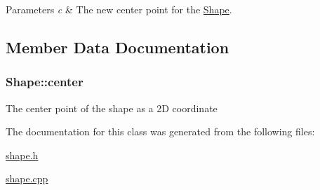 \begin{DoxyParams}{Parameters}
{\em c} & The new center point for the \hyperlink{class_shape}{Shape}. \\
\hline
\end{DoxyParams}


\subsection{Member Data Documentation}
\subsubsection[{\texorpdfstring{center}{center}}]{ Shape\+::center\hspace{0.3cm}{\ttfamily [protected]}}\hypertarget{class_shape_afa00babba48f541ad2754cb22a83c421}{}\label{class_shape_afa00babba48f541ad2754cb22a83c421}
The center point of the shape as a 2D coordinate 

The documentation for this class was generated from the following files\+:\begin{DoxyCompactItemize}
\item 
\hyperlink{shape_8h}{shape.\+h}\item 
\hyperlink{shape_8cpp}{shape.\+cpp}\end{DoxyCompactItemize}
